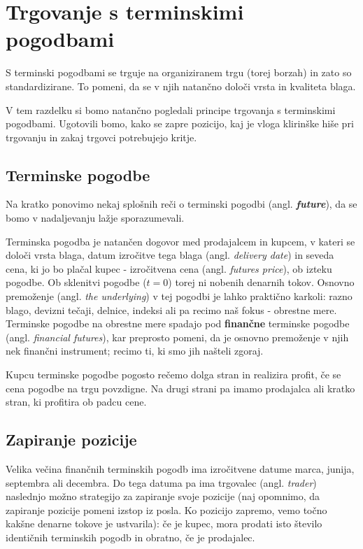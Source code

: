 \documentclass[a4paper, 11pt]{article}
\begin{document}
\section{Trgovanje s terminskimi pogodbami}
S terminski pogodbami se trguje na organiziranem trgu (torej borzah) in zato so standardizirane. 
To pomeni, da se v njih natančno določi vrsta in kvaliteta blaga.

V tem razdelku si bomo natančno pogledali principe trgovanja s terminskimi pogodbami. Ugotovili
bomo, kako se zapre pozicijo, kaj je vloga klirinške hiše pri trgovanju in zakaj trgovci potrebujejo
kritje.

\subsection{Terminske pogodbe}
Na kratko ponovimo nekaj splošnih reči o terminski pogodbi (angl. \textit{\textbf{future}}), da se 
bomo v nadaljevanju lažje sporazumevali.

Terminska pogodba je natančen dogovor med prodajalcem in kupcem, v kateri se določi vrsta
blaga, datum izročitve tega blaga (angl. \textit{delivery date}) in seveda cena, 
ki jo bo plačal kupec - izročitvena cena (angl. \textit{futures price}), ob izteku pogodbe. 
Ob sklenitvi pogodbe ($t = 0$) torej ni nobenih denarnih tokov.
Osnovno premoženje (angl. \textit{the underlying}) v tej pogodbi je lahko praktično karkoli: 
razno blago, devizni tečaji, delnice, indeksi ali pa recimo naš fokus - obrestne mere. 
Terminske pogodbe na obrestne mere spadajo pod \textbf{finančne} terminske pogodbe 
(angl. \textit{financial futures}), kar preprosto pomeni, da je osnovno premoženje v njih nek
finančni instrument; recimo ti, ki smo jih našteli zgoraj.

Kupcu terminske pogodbe pogosto rečemo dolga stran in realizira profit, če se cena pogodbe na 
trgu povzdigne. Na drugi strani pa imamo prodajalca ali kratko stran, ki profitira ob padcu cene.

\subsection{Zapiranje pozicije}
Velika večina finančnih terminskih pogodb ima izročitvene datume marca, junija, septembra ali 
decembra. Do tega datuma pa ima trgovalec (angl. \textit{trader}) naslednjo možno strategijo za 
zapiranje svoje pozicije (naj opomnimo, da zapiranje pozicije pomeni izstop iz posla. Ko pozicijo 
zapremo, vemo točno kakšne denarne tokove je ustvarila): če je kupec, mora prodati isto število 
identičnih terminskih pogodb in obratno, če je prodajalec.
\end{document}
